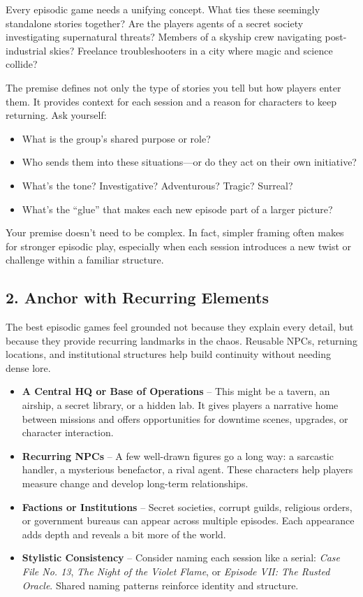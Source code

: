 Every episodic game needs a unifying concept. What ties these seemingly standalone stories together? Are the players agents of a secret society investigating supernatural threats? Members of a skyship crew navigating post-industrial skies? Freelance troubleshooters in a city where magic and science collide?

The premise defines not only the type of stories you tell but how players enter them. It provides context for each session and a reason for characters to keep returning. Ask yourself:

\begin{itemize}
    \item What is the group’s shared purpose or role?
    \item Who sends them into these situations—or do they act on their own initiative?
    \item What’s the tone? Investigative? Adventurous? Tragic? Surreal?
    \item What’s the “glue” that makes each new episode part of a larger picture?
\end{itemize}

Your premise doesn't need to be complex. In fact, simpler framing often makes for stronger episodic play, especially when each session introduces a new twist or challenge within a familiar structure.

\subsection*{2. Anchor with Recurring Elements}

The best episodic games feel grounded not because they explain every detail, but because they provide recurring landmarks in the chaos. Reusable NPCs, returning locations, and institutional structures help build continuity without needing dense lore.

\begin{itemize}
    \item \textbf{A Central HQ or Base of Operations} – This might be a tavern, an airship, a secret library, or a hidden lab. It gives players a narrative home between missions and offers opportunities for downtime scenes, upgrades, or character interaction.

    \item \textbf{Recurring NPCs} – A few well-drawn figures go a long way: a sarcastic handler, a mysterious benefactor, a rival agent. These characters help players measure change and develop long-term relationships.

    \item \textbf{Factions or Institutions} – Secret societies, corrupt guilds, religious orders, or government bureaus can appear across multiple episodes. Each appearance adds depth and reveals a bit more of the world.

    \item \textbf{Stylistic Consistency} – Consider naming each session like a serial: \emph{Case File No. 13}, \emph{The Night of the Violet Flame}, or \emph{Episode VII: The Rusted Oracle}. Shared naming patterns reinforce identity and structure.
\end{itemize}

